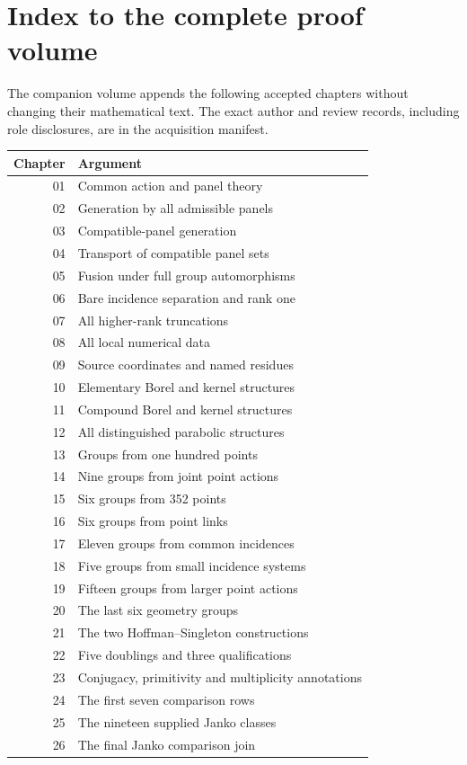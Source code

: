 \section{Index to the complete proof volume}
The companion volume appends the following accepted chapters without changing their mathematical text. The exact author and review records, including role disclosures, are in the acquisition manifest.
\small
\begin{longtable}{rp{125mm}}
\toprule Chapter&Argument\\\midrule\endhead
01&Common action and panel theory\\
02&Generation by all admissible panels\\
03&Compatible-panel generation\\
04&Transport of compatible panel sets\\
05&Fusion under full group automorphisms\\
06&Bare incidence separation and rank one\\
07&All higher-rank truncations\\
08&All local numerical data\\
09&Source coordinates and named residues\\
10&Elementary Borel and kernel structures\\
11&Compound Borel and kernel structures\\
12&All distinguished parabolic structures\\
13&Groups from one hundred points\\
14&Nine groups from joint point actions\\
15&Six groups from 352 points\\
16&Six groups from point links\\
17&Eleven groups from common incidences\\
18&Five groups from small incidence systems\\
19&Fifteen groups from larger point actions\\
20&The last six geometry groups\\
21&The two Hoffman--Singleton constructions\\
22&Five doublings and three qualifications\\
23&Conjugacy, primitivity and multiplicity annotations\\
24&The first seven comparison rows\\
25&The nineteen supplied Janko classes\\
26&The final Janko comparison join\\
\bottomrule\end{longtable}
\normalsize
